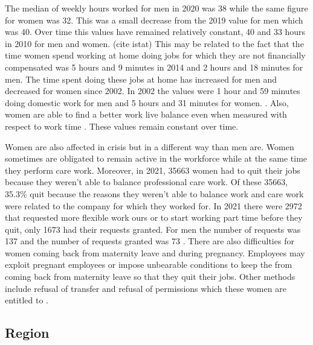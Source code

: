 \documentclass[12pt]{article}
\begin{document}
\begin{spacing}{1.5}
The median of weekly hours worked for men in 2020 was 38 while the same figure for women was 32. This was a small decrease from the 2019 value for men which was 40. Over time this values have remained relatively constant, 40 and 33 hours in 2010 for men and women. (cite istat)  This may be related to the fact that the time women spend working at home doing jobs for which they are not financially compensated was 5 hours and 9 minutes in 2014 and 2 hours and 18 minutes for men. The time spent doing these jobs at home has increased for men and decreased for women since 2002. In 2002 the values were 1 hour and 59 minutes doing domestic work for men and 5 hours and 31 minutes for women. \cite{cappadozzi2019tempi}. Also, women are able to find a better work live balance even when measured with respect to work time \cite{canal2018punto}. These values remain constant over time.

Women are also affected in crisis but in a different way than men are. Women sometimes are obligated to remain active in the workforce while at the same time they perform care work. Moreover, in 2021, 35663 women had to quit their jobs because they weren't able to balance professional care work. Of these 35663, 35.3\% quit because the reasons they weren't able to balance work and care work were related to the company for which they worked for. In 2021 there were 2972 that requested more flexible work ours or to start working part time before they quit, only 1673 had their requests granted. For men the number of requests was 137 and the number of requests granted was 73 \cite{del2022relazione}. There are also difficulties for women coming back from maternity leave and during pregnancy. Employees may exploit pregnant employees or impose unbearable conditions to keep the from coming back from maternity leave so that they quit their jobs. Other methods include refusal of transfer and refusal of permissions which these women are entitled to \cite{toffanin2018donne}.

\end{spacing}

\subsection{Region}
\end{document}
